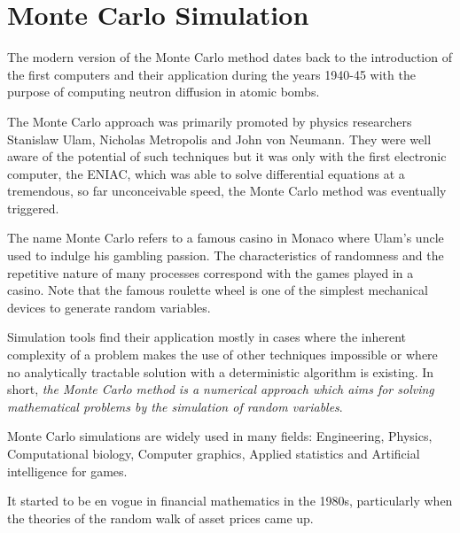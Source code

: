\chapter{Monte Carlo Simulation}\label{cap:montecarlo}

The modern version of the Monte Carlo method dates back to the
introduction of the first computers and their application during the
years 1940-45 with the purpose of computing neutron diffusion in atomic
bombs.

The Monte Carlo approach was primarily promoted by physics
researchers Stanislaw Ulam, Nicholas Metropolis and John von Neumann.
They were well aware of the potential of such techniques but it was only
with the first electronic computer, the ENIAC, which was able to solve
differential equations at a tremendous, so far unconceivable speed, the
Monte Carlo method was eventually triggered.

The name Monte Carlo refers to a famous casino in Monaco where Ulam's
uncle used to indulge his gambling passion. 
The characteristics of
randomness and the repetitive nature of many processes correspond with
the games played in a casino. Note that the famous roulette wheel is
one of the simplest mechanical devices to generate random variables.

Simulation tools find their application mostly in cases where the
inherent complexity of a problem makes the use of other techniques
impossible or where no analytically tractable solution with a
deterministic algorithm is existing. In short, \emph{the Monte Carlo method is
a numerical approach which aims for solving mathematical problems by the
simulation of random variables}.

Monte Carlo simulations are widely used in many fields: Engineering,
Physics, Computational biology, Computer graphics, Applied statistics and 
Artificial intelligence for games.

It started to be en vogue in financial mathematics in the 1980s,
particularly when the theories of the random walk of asset prices came
up.



